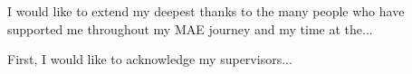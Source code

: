 %
%

\begin{acknowledgements}

I would like to extend my deepest thanks to the many people who have supported
me throughout my \gls{MAE} journey and my time at the...

\noindent
First, I would like to acknowledge my supervisors...


\end{acknowledgements}
